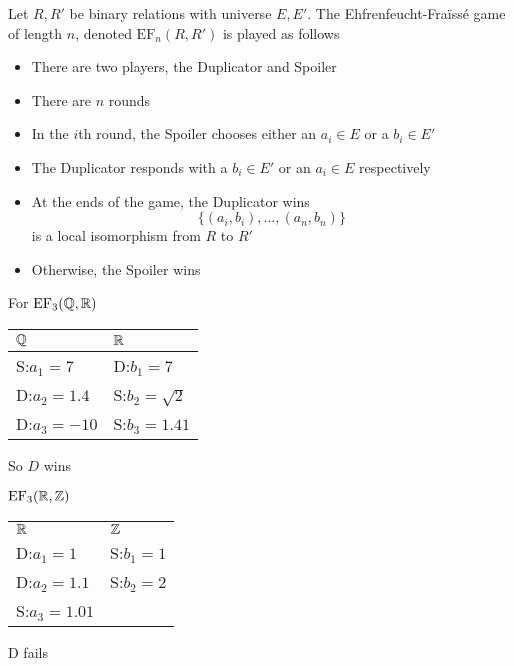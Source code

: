 \documentclass[11pt]{article}
\def \EF {\text{EF}}
\begin{document}
\begin{definition}[]
Let \(R,R'\) be binary relations with universe \(E,E'\). The Ehfrenfeucht-Fraïssé game of
length \(n\), denoted \(\EF_n(R,R')\) is played as follows
\begin{itemize}
\item There are two players, the Duplicator and Spoiler
\item There are \(n\) rounds
\item In the \(i\)th round, the Spoiler chooses either an \(a_i\in E\) or a \(b_i\in E'\)
\item The Duplicator responds with a \(b_i\in E'\) or an \(a_i\in E\) respectively
\item At the ends of the game, the Duplicator wins
\begin{equation*}
\{(a_i,b_i),\dots,(a_n,b_n)\}
\end{equation*}
is a local isomorphism from \(R\) to \(R'\)
\item Otherwise, the Spoiler wins
\end{itemize}
\end{definition}

\begin{examplle}[]
For \(\EF_3(\Q,\R)\)
\begin{center}
\begin{tabular}{ll}
\(\mathbb{Q}\) & \(\mathbb{R}\)\\
\hline
S:\(a_1=7\) & D:\(b_1=7\)\\
D:\(a_2=1.4\) & S:\(b_2=\sqrt{2}\)\\
D:\(a_3=-10\) & S:\(b_3=1.41\)\\
\end{tabular}
\end{center}

So \(D\) wins
\end{examplle}

\begin{examplle}[]
\(\EF_3(\R,\Z)\)

\begin{center}
\begin{tabular}{ll}
\(\mathbb{R}\) & \(\mathbb{Z}\)\\
D:\(a_1=1\) & S:\(b_1=1\)\\
D:\(a_2=1.1\) & S:\(b_2=2\)\\
S:\(a_3=1.01\) & \\
\end{tabular}
\end{center}
D fails
\end{examplle}
\end{document}
